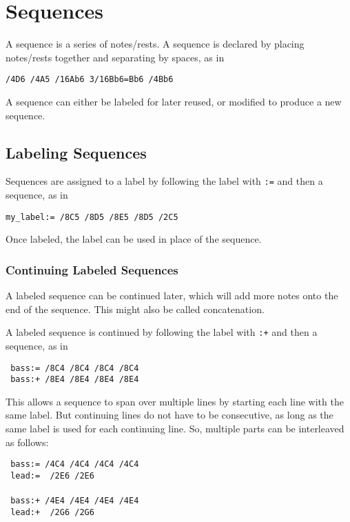 \documentclass{scrartcl}
\begin{document}
\section{Sequences}
A sequence is a series of notes/rests. A sequence is declared by placing notes/rests together and separating by spaces, as in 
\begin{center}
\verb|/4D6 /4A5 /16Ab6 3/16Bb6=Bb6 /4Bb6|
\end{center}

A sequence can either be labeled for later reused, or modified to produce a new sequence.

\subsection{Labeling Sequences}
Sequences are assigned to a label by following the label with \verb|:=| and then a sequence, as in
\begin{center}
\verb|my_label:= /8C5 /8D5 /8E5 /8D5 /2C5|
\end{center}

Once labeled, the label can be used in place of the sequence. 

\subsubsection{Continuing Labeled Sequences}
A labeled sequence can be continued later, which will add more notes onto the end of the sequence. This might also be called concatenation.

A labeled sequence is continued by following the label with \verb|:+| and then a sequence, as in
\begin{tabbing}
  \hspace{1in}\= \verb| bass:= /8C4 /8C4 /8C4 /8C4| \\
  \> \verb| bass:+ /8E4 /8E4 /8E4 /8E4|
\end{tabbing}

This allows a sequence to span over multiple lines by starting each line with the same label. But continuing lines do not have to be consecutive, as long as the same label is used for each continuing line. So, multiple parts can be interleaved as follows:
\begin{tabbing}
  \hspace{1in}\= \verb| bass:= /4C4 /4C4 /4C4 /4C4| \\
  \> \verb| lead:=  /2E6 /2E6| \\
  \> ~\\
  \> \verb| bass:+ /4E4 /4E4 /4E4 /4E4| \\
  \> \verb| lead:+  /2G6 /2G6| \\
\end{tabbing}
\end{document}
